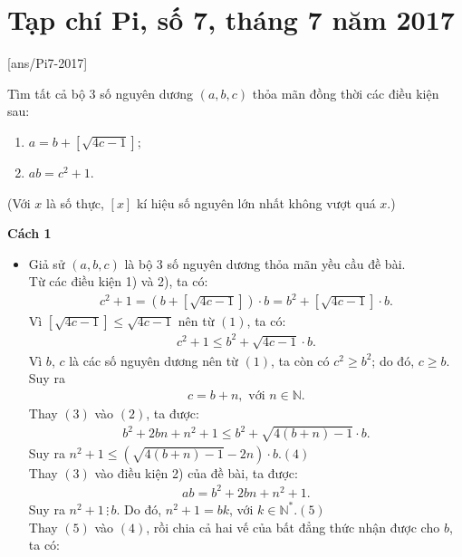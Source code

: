 \section{Tạp chí Pi, số 7,  tháng 7 năm 2017}
[ans/Pi7-2017]
\begin{bt}%
	Tìm tất cả bộ $3$ số nguyên dương $(a, b, c)$ thỏa mãn đồng thời các điều kiện sau:
	\begin{enumerate}[1)]
		\item $a = b + \left[\sqrt{4c - 1}\right]$;
		\item $ab = c^2 + 1$.
	\end{enumerate}
	(Với $x$ là số thực, $\left[x \right]$ kí hiệu số nguyên lớn nhất không vượt quá $x$.)
	\loigiai
	{
		\textbf{Cách 1}
		\begin{itemize}
			\item Giả sử $(a, b, c)$ là bộ $3$ số nguyên dương thỏa mãn yều cầu đề bài.\\
			Từ các điều kiện 1) và 2), ta có:
			\begin{align}
				c^2 + 1 = \left(b + \left[\sqrt{4c - 1}\right]\right) \cdot b = b^2 + \left[\sqrt{4c - 1}\right] \cdot b. \tag{1}
			\end{align}
			Vì $\left[\sqrt{4c - 1}\right] \leq \sqrt{4c - 1}$ nên từ $(1)$, ta có:
			\begin{align}
				c^2 + 1 \leq b^2 + \sqrt{4c - 1} \cdot b. \tag{2}
			\end{align}
			Vì $b$, $c$ là các số nguyên dương nên từ $(1)$, ta còn có $c^2 \geq b^2$; do đó, $c \geq b$. Suy ra
			\begin{align}
				c = b + n, \,\, \text{với $n \in \mathbb{N}$}. \tag{3}
			\end{align}
Thay $(3)$ vào $(2)$, ta được:
			\begin{align*}
				b^2 + 2bn + n^2 + 1 \leq b^2 + \sqrt{4(b + n) - 1} \cdot b.
			\end{align*}
			Suy ra $n^2 + 1 \leq \left(\sqrt{4(b + n) - 1} - 2n\right) \cdot b.$\hfill$(4)$\\
			Thay $(3)$ vào điều kiện 2) của đề bài, ta được:
			\begin{align*}
				ab = b^2 + 2bn + n^2 + 1.
			\end{align*}
			Suy ra $n^2 + 1 \,\vdots\, b$. Do đó,
			$n^2 + 1 = bk$, 
		với $k \in \mathbb{N}^*$.\hfill$(5)$\\
			Thay $(5)$ vào $(4)$, rồi chia cả hai vế của bất đẳng thức nhận được cho $b$, ta có:
			\begin{align*}

\end{align*}
\end{itemize}}
\end{bt}
